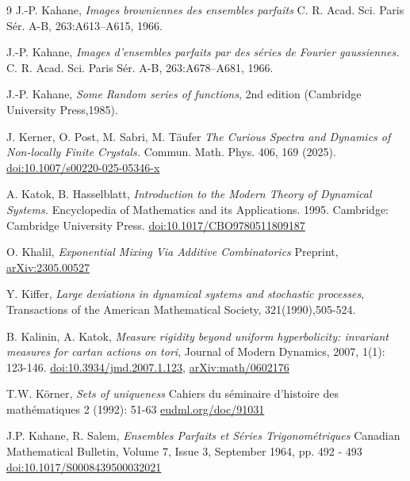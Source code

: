 \documentclass[a4paper]{article}
\theoremstyle{definition}
\begin{document}
\begin{thebibliography}{9}
    {J.-P. Kahane},
    \emph{Images browniennes des ensembles parfaits}
    C. R. Acad. Sci. Paris Sér. A-B, 263:A613–A615, 1966.


    {J.-P. Kahane},
    \emph{Images d’ensembles parfaits par des séries de Fourier gaussiennes.}
    C. R. Acad. Sci. Paris Sér. A-B, 263:A678–A681, 1966.



    {J.-P. Kahane},
    \emph{Some Random series of functions}, 2nd edition (Cambridge University Press,1985).

    {J. Kerner, O. Post, M. Sabri, M. Täufer }
    \emph{The Curious Spectra and Dynamics of Non-locally Finite Crystals.}
    Commun. Math. Phys. 406, 169 (2025). \href{https://doi.org/10.1007/s00220-025-05346-x}{doi:10.1007/s00220-025-05346-x}

    {A. Katok, B. Hasselblatt},
    \emph{Introduction to the Modern Theory of Dynamical Systems.}
    Encyclopedia of Mathematics and its Applications. 1995. Cambridge: Cambridge University Press. \href{https://doi.org/10.1017/CBO9780511809187}{doi:10.1017/CBO9780511809187}

    {O. Khalil},
    \emph{Exponential Mixing Via Additive Combinatorics}
    Preprint, \href{https://arxiv.org/abs/2305.00527}{arXiv:2305.00527}


    {Y. Kiffer},
    \emph{Large deviations in dynamical systems and stochastic processes},
    Transactions of the American Mathematical Society, 321(1990),505-524.


    {B. Kalinin, A. Katok,}
    \emph{Measure rigidity beyond uniform hyperbolicity: invariant measures for cartan actions on tori}, Journal of Modern Dynamics, 2007, 1(1): 123-146.   \href{https://www.aimsciences.org/article/doi/10.3934/jmd.2007.1.123}{doi:10.3934/jmd.2007.1.123},  \href{https://arxiv.org/abs/math/0602176v1}{arXiv:math/0602176}


    {T.W. Körner},
    \emph{Sets of uniqueness} Cahiers du séminaire d'histoire des mathématiques 2 (1992): 51-63 \href{https://eudml.org/doc/91031}{eudml.org/doc/91031}


    {J.P. Kahane, R. Salem},
    \emph{ Ensembles Parfaits et Séries Trigonométriques}
    Canadian Mathematical Bulletin, Volume 7, Issue 3, September 1964, pp. 492 - 493 \href{https://www.cambridge.org/core/journals/canadian-mathematical-bulletin/article/ensembles-parfaits-et-series-trigonometriques-by-j-p-kahane-and-r-salem-hermann-paris-1963-paperback-188-pages-27-f/CD1EA7BBCCBDC467866D431347877BEA}{doi:10.1017/S0008439500032021}


\end{thebibliography}
\end{document}
